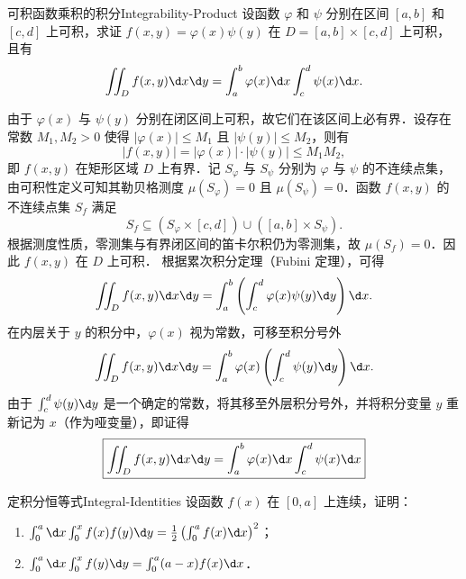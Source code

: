 \begin{problem}{可积函数乘积的积分}{Integrability-Product}
    设函数 $\varphi$ 和 $\psi$ 分别在区间 $[a, b]$ 和 $[c, d]$ 上可积，求证 $f(x, y) = \varphi(x) \psi(y)$ 在 $D = [a, b] \times [c, d]$ 上可积，且有
    \begin{equation}
        \iint_{D} f(x, y) \d x \d y = \int_{a}^{b} \varphi(x) \d x \int_{c}^{d} \psi(x) \d x.
    \end{equation}
\end{problem}

\begin{myproof}

    由于 $\varphi(x)$ 与 $\psi(y)$ 分别在闭区间上可积，故它们在该区间上必有界．设存在常数 $M_1, M_2 > 0$ 使得 $|\varphi(x)| \leqslant M_1$ 且 $|\psi(y)| \leqslant M_2$，则有
    \begin{equation}
        |f(x, y)| = |\varphi(x)| \cdot |\psi(y)| \leqslant M_1 M_2,
    \end{equation}
    即 $f(x, y)$ 在矩形区域 $D$ 上有界．记 $S_\varphi$ 与 $S_\psi$ 分别为 $\varphi$ 与 $\psi$ 的不连续点集，由可积性定义可知其勒贝格测度 $\mu(S_\varphi) = 0$ 且 $\mu(S_\psi) = 0$．函数 $f(x, y)$ 的不连续点集 $S_f$ 满足
    \begin{equation}
        S_f \subseteq (S_\varphi \times [c, d]) \cup ([a, b] \times S_\psi).
    \end{equation}
    根据测度性质，零测集与有界闭区间的笛卡尔积仍为零测集，故 $\mu(S_f) = 0$．因此 $f(x, y)$ 在 $D$ 上可积．
    根据累次积分定理（Fubini 定理），可得
    \begin{equation}\label{eq:fubini-calc}
        \iint_{D} f(x, y) \d x \d y = \int_{a}^{b} \left( \int_{c}^{d} \varphi(x) \psi(y) \d y \right) \d x.
    \end{equation}
    在内层关于 $y$ 的积分中，$\varphi(x)$ 视为常数，可移至积分号外
    \begin{equation}
        \iint_{D} f(x, y) \d x \d y = \int_{a}^{b} \varphi(x) \left( \int_{c}^{d} \psi(y) \d y \right) \d x.
    \end{equation}
    由于 $\int_{c}^{d} \psi(y) \d y$ 是一个确定的常数，将其移至外层积分号外，并将积分变量 $y$ 重新记为 $x$（作为哑变量），即证得
    \begin{equation}
        \boxed{\iint_{D} f(x, y) \d x \d y = \int_{a}^{b} \varphi(x) \d x \int_{c}^{d} \psi(x) \d x}
    \end{equation}
\end{myproof}


\begin{problem}{定积分恒等式}{Integral-Identities}
    设函数 $f(x)$ 在 $[0, a]$ 上连续，证明：
    \begin{enumerate}
        \item $\int_0^a \d x \int_0^x f(x)f(y) \d y = \frac{1}{2} \left( \int_0^a f(x) \d x \right)^2$；
        \item $\int_0^a \d x \int_0^x f(y) \d y = \int_0^a (a-x)f(x) \d x$．
    \end{enumerate}
\end{problem}

